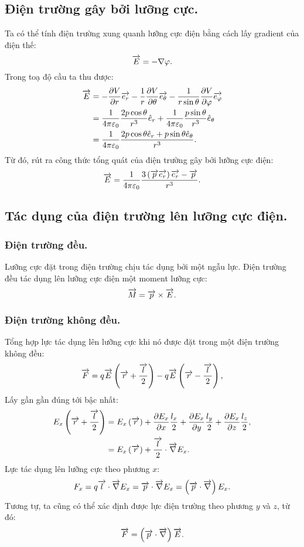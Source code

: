 \begin{appendices}
\subsection{Điện trường gây bởi lưỡng cực.}
    Ta có thể tính điện trường xung quanh lưỡng cực điện bằng cách lấy gradient của điện thế:
    $$\overrightarrow{E}=-\nabla\varphi.$$
    Trong toạ độ cầu ta thu được:
    \begin{align*}
    \overrightarrow{E}&=-\dfrac{\partial V}{\partial r}\overrightarrow{{e_r}}-\dfrac{1}{r}\dfrac{\partial V}{\partial \theta}\overrightarrow{{e}_\theta}-\dfrac{1}{r\sin{\theta}}\dfrac{\partial V}{\partial \varphi}\overrightarrow{{e}_\varphi}\\
    &=\dfrac{1}{4\pi \varepsilon_0}\dfrac{2p\cos{\theta}}{r^3}\hat{{e}}_r+ \dfrac{1}{4\pi \varepsilon_0}\dfrac{p\sin{\theta}}{r^3}\hat{{e}}_\theta\\
    &=\dfrac{1}{4\pi \varepsilon_0}\dfrac{2p\cos{\theta}\hat e_r+p\sin{\theta}\hat e_\theta}{r^3}.
    \end{align*}
    Từ đó, rút ra công thức tổng quát của điện trường gây bởi lưỡng cực điện:
    $$\overrightarrow{E}=\dfrac{1}{4\pi \varepsilon_0}\dfrac{3\left(\overrightarrow{p}\overrightarrow{{e_r}}\right)\overrightarrow{{e_r}}-\overrightarrow{p}}{r^3}.$$
\subsection{Tác dụng của điện trường lên lưỡng cực điện.}
\subsubsection{Điện trường đều.}
    Lưỡng cực đặt trong điện trường chịu tác dụng bởi một ngẫu lực. Điện trường đều tác dụng lên lưỡng cực điện một moment lưỡng cực:
    $$\overrightarrow{M}=\overrightarrow{p}\times\overrightarrow{E}.$$
\subsubsection{Điện trường không đều.}
    Tổng hợp lực tác dụng lên lưỡng cực khi nó được đặt trong một điện trường không đều:
    $$\overrightarrow{F}=q\overrightarrow{E}\left(\overrightarrow{r}+\dfrac{\overrightarrow{l}}{2}\right)-q\overrightarrow{E}\left(\overrightarrow{r}-\dfrac{\overrightarrow{l}}{2}\right),$$
    Lấy gần gần đúng tới bậc nhất:
    \begin{align*}
    E_x\left(\overrightarrow{r}+\dfrac{\overrightarrow{l}}{2}\right)&=E_x\left(\overrightarrow{r}\right)+\dfrac{\partial E_x}{\partial x}\dfrac{l_x}{2}+\dfrac{\partial E_x}{\partial y}\dfrac{l_y}{2}+\dfrac{\partial E_x}{\partial z}\dfrac{l_z}{2},\\
    &=E_x\left(\overrightarrow{r}\right)+\dfrac{\overrightarrow{l}}{2}\cdot \overrightarrow{\nabla} E_x.
    \end{align*}
    Lực tác dụng lên lưỡng cực theo phương $x$:
    $$F_x=q\overrightarrow{l}\cdot \overrightarrow{\nabla} E_x=\overrightarrow{p}\cdot\overrightarrow{\nabla} E_x=\left(\overrightarrow{p}\cdot\overrightarrow{\nabla}\right) E_x.$$
    Tương tự, ta cũng có thể xác định được lực điện trường theo phương $y$ và $z$, từ đó:
    $$\overrightarrow{F}=\left(\overrightarrow{p}\cdot\overrightarrow{\nabla}\right) \overrightarrow{E}.$$

\end{appendices}
